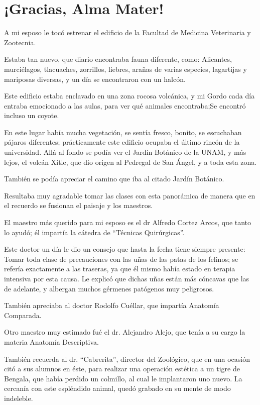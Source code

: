 \documentclass[letterpaper, 12pt]{book}
\begin{document}
\chapter{¡Gracias, Alma Mater!}
A mi esposo le tocó estrenar el edificio de la Facultad de Medicina Veterinaria y Zootecnia. 

Estaba tan nuevo, que diario encontraba fauna diferente, como: Alicantes, murciélagos, tlacuaches, zorrillos, liebres, arañas de varias especies, lagartijas y mariposas diversas, y un día se encontraron con un halcón.

Este edificio estaba enclavado en una zona rocosa volcánica, y mi Gordo cada día entraba emocionado a las aulas, para ver qué animales encontraba;Se encontró incluso un coyote.

En este lugar había mucha vegetación, se sentía fresco, bonito, se escuchaban pájaros diferentes; prácticamente este edificio ocupaba el último rincón de la universidad.
Allá al fondo se podía ver el Jardín Botánico de la UNAM, y más lejos, el volcán Xitle, que dio origen al Pedregal de San Ángel, y a toda esta zona.

También se podía apreciar el camino que iba al citado Jardín Botánico.

Resultaba muy agradable tomar las clases con esta panorámica de manera que en el recuerdo se fusionan el paisaje y los maestros.

El maestro más querido para mi esposo es el dr Alfredo Cortez Arcos, que tanto lo ayudó; él impartía la cátedra de ``Técnicas Quirúrgicas''.

Este doctor un día le dio un  consejo que hasta la fecha tiene siempre presente: Tomar toda clase de precauciones con las uñas de las patas de los felinos; se refería exactamente a las traseras, ya que él mismo había estado en terapia intensiva por esta causa. Le explicó que dichas uñas están más cóncavas que las de adelante, y albergan muchos gérmenes patógenos muy peligrosos.

También apreciaba al doctor Rodolfo Cuéllar, que impartía Anatomía Comparada.

Otro maestro muy estimado fué el dr. Alejandro Alejo, que tenía a su cargo la materia Anatomía Descriptiva.

También recuerda al dr. ``Cabrerita'', director del Zoológico, que en una ocasión citó a sus alumnos en éste, para realizar una operación estética a un tigre de Bengala, que había perdido un colmillo, al cual le implantaron uno nuevo. La cercanía con este espléndido animal, quedó grabado en su mente de modo
indeleble.
\end{document}
